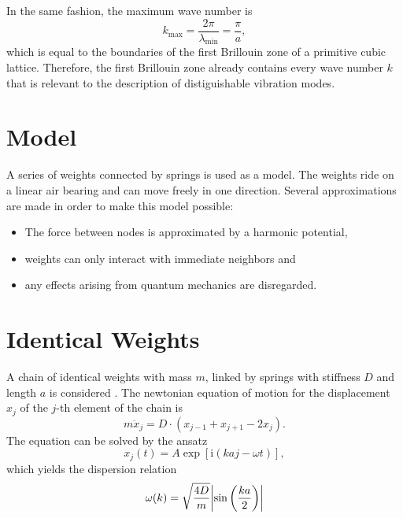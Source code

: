 In the same fashion, the maximum wave number is
\begin{equation*}
	k_\text{max}=\frac{2\pi}{\lambda_\text{min}}=\frac{\pi}{a},
\end{equation*}
which is equal to the boundaries of the first Brillouin zone of a primitive cubic lattice.
Therefore, the first Brillouin zone already contains every wave number $k$ that is relevant to the description of distiguishable vibration modes.

\section{Model}
A series of weights connected by springs is used as a model.
The weights ride on a linear air bearing and can move freely in one direction.
Several approximations are made in order to make this model possible:
\begin{itemize}
	\item The force between nodes is approximated by a harmonic potential,
	\item weights can only interact with immediate neighbors and
	\item any effects arising from quantum mechanics are disregarded.
\end{itemize}

\section{Identical Weights}
A chain of identical weights with mass $m$, linked by springs with stiffness $D$ and length $a$ is considered .
The newtonian equation of motion for the displacement $x_j$ of the $j$-th element of the chain is
\begin{equation*}
	m \ddot x_j = D \cdot \left(x_{j - 1} + x_{j + 1} - 2 x_j \right).
\end{equation*}
The equation can be solved by the ansatz
\begin{equation*}
	x_j(t) = A \exp\left[\text{i} \left(k a j - \omega t\right)\right],
\end{equation*}
which yields the dispersion relation
\begin{equation}
	\omega(k) = \sqrt{\frac{4D}{m}}\abs{\sin\left(\frac{ka}{2}\right)}
\end{equation}

